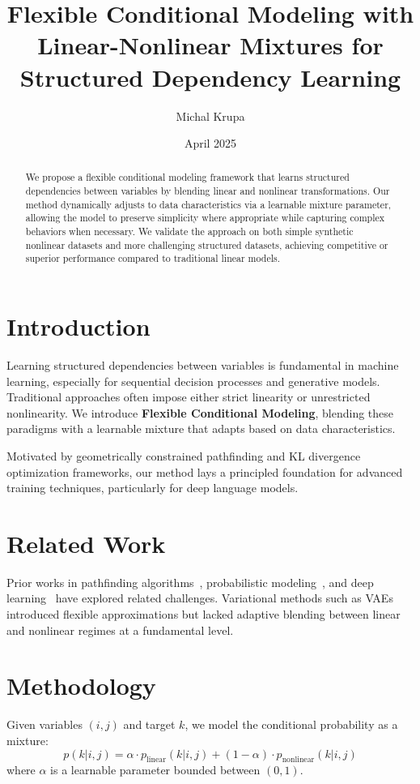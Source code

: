 \documentclass[11pt]{article}
\title{Flexible Conditional Modeling with Linear-Nonlinear Mixtures for Structured Dependency Learning}
\author{Michal Krupa}
\date{April 2025}
\begin{document}
\maketitle

\begin{abstract}
We propose a flexible conditional modeling framework that learns structured dependencies between variables by blending linear and nonlinear transformations. Our method dynamically adjusts to data characteristics via a learnable mixture parameter, allowing the model to preserve simplicity where appropriate while capturing complex behaviors when necessary. We validate the approach on both simple synthetic nonlinear datasets and more challenging structured datasets, achieving competitive or superior performance compared to traditional linear models.
\end{abstract}

\section{Introduction}
Learning structured dependencies between variables is fundamental in machine learning, especially for sequential decision processes and generative models. Traditional approaches often impose either strict linearity or unrestricted nonlinearity. We introduce \textbf{Flexible Conditional Modeling}, blending these paradigms with a learnable mixture that adapts based on data characteristics.

Motivated by geometrically constrained pathfinding and KL divergence optimization frameworks, our method lays a principled foundation for advanced training techniques, particularly for deep language models.

\section{Related Work}
\label{sec:related}
Prior works in pathfinding algorithms~\cite{lavalle2006planning}, probabilistic modeling~\cite{cover2006elements}, and deep learning~\cite{goodfellow2016deep} have explored related challenges. Variational methods such as VAEs~\cite{kingma2014auto} introduced flexible approximations but lacked adaptive blending between linear and nonlinear regimes at a fundamental level.

\section{Methodology}
Given variables $(i, j)$ and target $k$, we model the conditional probability as a mixture:
\begin{equation}
    p(k|i,j) = \alpha \cdot p_{\text{linear}}(k|i,j) + (1-\alpha) \cdot p_{\text{nonlinear}}(k|i,j)
\end{equation}
where $\alpha$ is a learnable parameter bounded between $(0,1)$.
\end{document}
